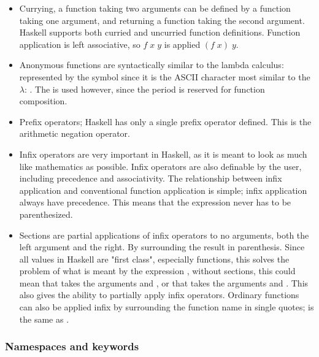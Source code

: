 \begin{itemize}

\item{Currying}, a function taking two arguments can be defined by a function taking one argument,
and returning a function taking the second argument. Haskell supports both curried and uncurried
function definitions. Function application is left associative, so $f\;x\;y$ is applied $(f\;x)\;y$.
\cite{hudak2007history}

\item{Anonymous functions} are syntactically similar to the lambda calculus:
represented by the \inhas{\textbackslash} symbol since it is the ASCII character
most similar to the $\lambda$:  . 
The \inhas{->} is used however, since the period is reserved
for function composition. \cite{hudak2007history}

\item{Prefix operators}; Haskell has only a single prefix operator defined. This is the arithmetic
negation operator.\cite{hudak2007history}

\item{Infix operators} are very important in Haskell, as it is meant to look as much like mathematics
as possible. Infix operators are also definable by the user, including precedence and associativity.
The relationship between infix application and conventional function application is simple; infix
application always have precedence. This means that the expression 
 never has
to be parenthesized.\cite{hudak2007history}

\item{Sections} are partial applications of infix operators to no arguments, both the left argument and
the right. By surrounding the result in parenthesis. 
Since all values in Haskell are "first class", especially functions, 
this solves the problem of what is meant by the
expression , without sections, this could mean that 
\inhas{+} takes the arguments  and 
,
or that  takes the arguments \inhas{+} 
and . This also gives the ability to partially apply infix
operators. Ordinary functions can also be applied infix by surrounding the function name in single
quotes;  is the same as . 
\cite{hudak2007history}

\end{itemize}

\subsubsection{Namespaces and keywords}

